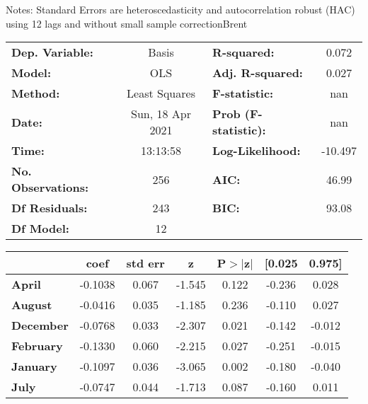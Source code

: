 Notes: \newline
 [1] Standard Errors are heteroscedasticity and autocorrelation robust (HAC) using 12 lags and without small sample correctionBrent\begin{center}
\begin{tabular}{lclc}
\toprule
\textbf{Dep. Variable:}    &      Basis       & \textbf{  R-squared:         } &     0.072   \\
\textbf{Model:}            &       OLS        & \textbf{  Adj. R-squared:    } &     0.027   \\
\textbf{Method:}           &  Least Squares   & \textbf{  F-statistic:       } &       nan   \\
\textbf{Date:}             & Sun, 18 Apr 2021 & \textbf{  Prob (F-statistic):} &      nan    \\
\textbf{Time:}             &     13:13:58     & \textbf{  Log-Likelihood:    } &   -10.497   \\
\textbf{No. Observations:} &         256      & \textbf{  AIC:               } &     46.99   \\
\textbf{Df Residuals:}     &         243      & \textbf{  BIC:               } &     93.08   \\
\textbf{Df Model:}         &          12      & \textbf{                     } &             \\
\bottomrule
\end{tabular}
\begin{tabular}{lcccccc}
                   & \textbf{coef} & \textbf{std err} & \textbf{z} & \textbf{P$> |$z$|$} & \textbf{[0.025} & \textbf{0.975]}  \\
\midrule
\textbf{April}     &      -0.1038  &        0.067     &    -1.545  &         0.122        &       -0.236    &        0.028     \\
\textbf{August}    &      -0.0416  &        0.035     &    -1.185  &         0.236        &       -0.110    &        0.027     \\
\textbf{December}  &      -0.0768  &        0.033     &    -2.307  &         0.021        &       -0.142    &       -0.012     \\
\textbf{February}  &      -0.1330  &        0.060     &    -2.215  &         0.027        &       -0.251    &       -0.015     \\
\textbf{January}   &      -0.1097  &        0.036     &    -3.065  &         0.002        &       -0.180    &       -0.040     \\
\textbf{July}      &      -0.0747  &        0.044     &    -1.713  &         0.087        &       -0.160    &        0.011     \\

\end{tabular}
\end{center}
